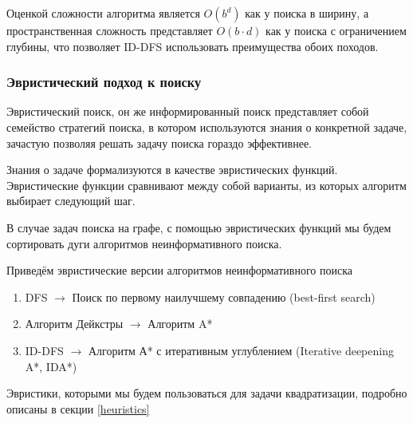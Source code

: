 Оценкой сложности алгоритма является $O(b^d)$ как у поиска в ширину, а пространственная сложность представляет $O(b \cdot d)$ как у поиска с ограничением глубины, что позволяет ID-DFS использовать преимущества обоих походов.

\subsubsection{Эвристический подход к поиску}

Эвристический поиск, он же информированный поиск представляет собой семейство стратегий поиска,
в котором используются знания о конкретной задаче, зачастую позволяя решать задачу поиска гораздо эффективнее.

Знания о задаче формализуются в качестве эвристических функций.
Эвристические функции сравнивают между собой варианты, из которых алгоритм выбирает следующий шаг.

В случае задач поиска на графе, с помощью эвристических функций мы будем сортировать дуги алгоритмов неинформативного поиска.

Приведём эвристические версии алгоритмов неинформативного поиска
\begin{enumerate}
    \item DFS $\rightarrow$ Поиск по первому наилучшему совпадению (best-first search)
    \item Алгоритм Дейкстры $\rightarrow$ Алгоритм A*
    \item ID-DFS $\rightarrow$ Алгоритм А* с итеративным углублением (Iterative deepening A*, IDA*)
\end{enumerate}


Эвристики, которыми мы будем пользоваться для задачи квадратизации, подробно описаны в секции \ref{heuristics}